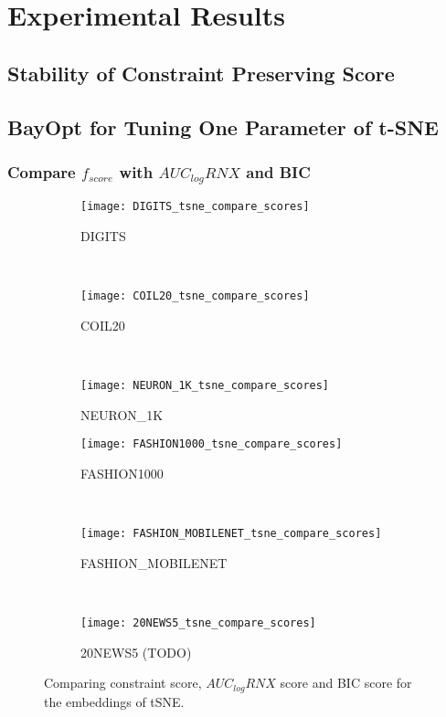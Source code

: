 \section{Experimental Results}

\subsection{Stability of Constraint Preserving Score}


\subsection{BayOpt for Tuning One Parameter of t-SNE}

\subsubsection*{Compare $f_{score}$ with $AUC_{log}RNX$ and BIC}

\begin{figure*}
\centering

\begin{subfigure}[b]{0.32\textwidth}
    \centering
    \texttt{[image: DIGITS\_tsne\_compare\_scores]}
    \caption{DIGITS}
\end{subfigure}
~
\begin{subfigure}[b]{0.32\textwidth}
    \texttt{[image: COIL20\_tsne\_compare\_scores]}
    \caption{COIL20}
\end{subfigure}
~
\begin{subfigure}[b]{0.32\textwidth}
    \texttt{[image: NEURON\_1K\_tsne\_compare\_scores]}
    \caption{NEURON\_1K}
\end{subfigure}

\vfill

\begin{subfigure}[b]{0.32\textwidth}
    \centering
    \texttt{[image: FASHION1000\_tsne\_compare\_scores]}
    \caption{FASHION1000}
\end{subfigure}
~
\begin{subfigure}[b]{0.32\textwidth}
    \texttt{[image: FASHION\_MOBILENET\_tsne\_compare\_scores]}
    \caption{FASHION\_MOBILENET}
\end{subfigure}
~
\begin{subfigure}[b]{0.32\textwidth}
    \texttt{[image: 20NEWS5\_tsne\_compare\_scores]}
    \caption{20NEWS5 (TODO)}
\end{subfigure}

\caption{Comparing constraint score, $AUC_{log}RNX$ score and BIC score for the embeddings of tSNE.}
\end{figure*}


